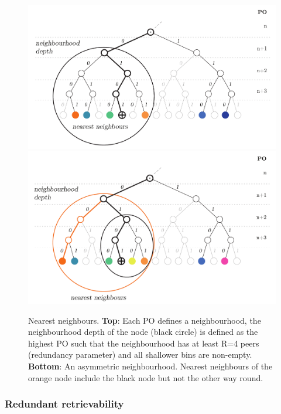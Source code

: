 \begin{figure}[htbp]
   \centering
   \includegraphics[width=\textwidth]{fig/nearest-neighbours-2.pdf}\\
   \includegraphics[width=\textwidth]{fig/asymmetric-nodes2.pdf}
   \caption[Nearest neighbours \statusgreen]{Nearest neighbours. \textbf{Top}: Each PO defines a neighbourhood, the neighbourhood depth of the node (black circle) is defined as the highest PO such that the neighbourhood has at least R=4 peers (redundancy parameter) and all shallower bins are non-empty. \textbf{Bottom}: An asymmetric neighbourhood. Nearest neighbours of the orange node include the black node but not the other way round.}
   \label{fig:nearest-neighbours}
\end{figure}


\subsubsection{Redundant retrievability}

